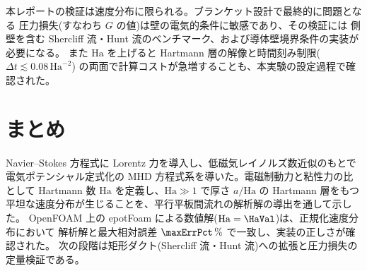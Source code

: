 \documentclass{ltjsarticle}   %
\newcommand{\Ha}{\mathrm{Ha}}
\begin{document}
本レポートの検証は速度分布に限られる。ブランケット設計で最終的に問題となる
圧力損失(すなわち $G$ の値)は壁の電気的条件に敏感であり、その検証には
側壁を含む Shercliff 流・Hunt 流のベンチマーク、および導体壁境界条件の実装が必要になる。
また $\Ha$ を上げると Hartmann 層の解像と時間刻み制限($\Delta t \lesssim 0.08\,\Ha^{-2}$)
の両面で計算コストが急増することも、本実験の設定過程で確認された。

\section{まとめ}

Navier--Stokes 方程式に Lorentz 力を導入し、低磁気レイノルズ数近似のもとで
電気ポテンシャル定式化の MHD 方程式系を導いた。電磁制動力と粘性力の比として
Hartmann 数 $\Ha$ を定義し、$\Ha\gg1$ で厚さ $a/\Ha$ の Hartmann 層をもつ
平坦な速度分布が生じることを、平行平板間流れの解析解の導出を通して示した。
OpenFOAM 上の epotFoam による数値解($\Ha=\HaVal$)は、正規化速度分布において
解析解と最大相対誤差 $\maxErrPct\,\%$ で一致し、実装の正しさが確認された。
次の段階は矩形ダクト(Shercliff 流・Hunt 流)への拡張と圧力損失の定量検証である。



\end{document}
